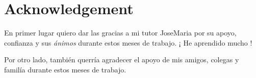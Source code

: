 %	

\chapter*{Acknowledgement}

En primer lugar quiero dar las gracias a mi tutor JoseMaria por su apoyo, confianza y sus \textit{ánimos} durante estos meses de trabajo. ¡ He aprendido mucho !

Por otro lado, también querría agradecer el apoyo de mis amigos, colegas y familía durante estos meses de trabajo.